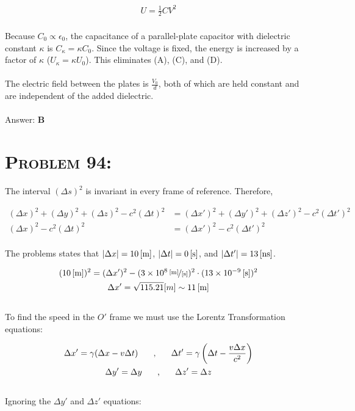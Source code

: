 \documentclass{article}
\providecommand{\e}[1]{\ensuremath{\times 10^{#1}}}
\begin{document}
\begin{gather}
U = \frac{1}{2} C V^{2}
\end{gather}
\\
Because $C_{0} \propto \epsilon_{0}$, the capacitance of a parallel-plate capacitor with dielectric constant $\kappa$ is $C_{\kappa} = \kappa C_{0}$. Since the voltage is fixed, the energy is increased by a factor of $\kappa$ ($U_{\kappa} = \kappa U_{0}$). This eliminates (A), (C), and (D). \\\\The electric field between the plates is $\frac{V_{0}}{d}$, both of which are held constant and are independent of the added dielectric.
\\\\
Answer: \textbf{\textcolor{ProcessBlue}B}\\


\section{\textsc{Problem 94:}} The interval $(\Delta s)^{2}$ is invariant in every frame of reference. Therefore,

\begin{align}
(\Delta x)^{2} + (\Delta y)^{2} + (\Delta z)^{2} - c^{2} (\Delta t)^{2} &= (\Delta x')^{2} + (\Delta y')^{2} + (\Delta z')^{2} - c^{2} (\Delta t')^{2}\\
(\Delta x)^{2} - c^{2} (\Delta t)^{2} &= (\Delta x')^{2} - c^{2} (\Delta t')^{2}\nonumber
\end{align}
\\
The problems states that $|\Delta x| = \unit[10]{[m]}$, $|\Delta t| = \unit[0]{[s]}$, and $|\Delta t'| = \unit[13]{[ns]}$.

\begin{gather}
(\unit[10]{[m]})^{2} = (\Delta x')^{2} - (\unitfrac[3\e{8}]{[m]}{[s]})^{2} \cdot (\unit[13\e{-9}]{[s]})^{2}\nonumber\\
\Delta x' = \sqrt{115.21} [m] \sim \unit[11]{[m]}\nonumber
\end{gather}
\\
To find the speed in the $O'$ frame we must use the Lorentz Transformation equations:

\begin{gather}
\Delta x' = \gamma (\Delta x - v \Delta t) \hspace{.25in} \text{,} \hspace{.25in} \Delta t' = \gamma \left(\Delta t - \frac{v \Delta x}{c^{2}} \right)\\
\Delta y' = \Delta y\hspace{.25in} \text{,} \hspace{.25in} \Delta z' = \Delta z
\end{gather}
\\
Ignoring the $\Delta y'$ and $\Delta z'$ equations:
\end{document}
